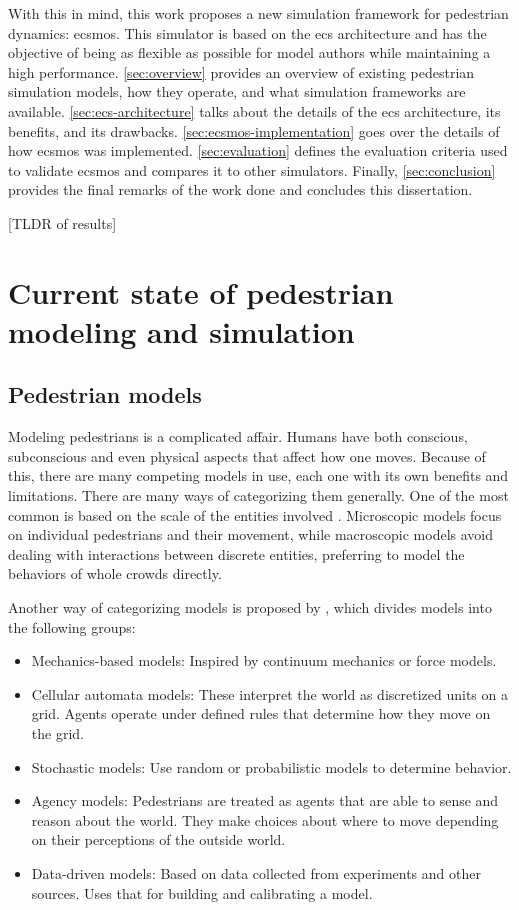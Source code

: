 \documentclass[twoside, 11pt]{article}
\begin{document}
With this in mind, this work proposes a new simulation framework for pedestrian dynamics: \gls{ecsmos}. This simulator is based on the \gls{ecs} architecture and has the objective of being as flexible as possible for model authors while maintaining a high performance. \autoref{sec:overview} provides an overview of existing pedestrian simulation models, how they operate, and what simulation frameworks are available. \autoref{sec:ecs-architecture} talks about the details of the \gls{ecs} architecture, its benefits, and its drawbacks. \autoref{sec:ecsmos-implementation} goes over the details of how \gls{ecsmos} was implemented. \autoref{sec:evaluation} defines the evaluation criteria used to validate \gls{ecsmos} and compares it to other simulators. Finally, \autoref{sec:conclusion} provides the final remarks of the work done and concludes this dissertation.

[TLDR of results]

\section{Current state of pedestrian modeling and simulation} \label{sec:overview}

\subsection{Pedestrian models}

Modeling pedestrians is a complicated affair. Humans have both conscious, subconscious and even physical aspects that affect how one moves. Because of this, there are many competing models in use, each one with its own benefits and limitations. There are many ways of categorizing them generally. One of the most common is based on the scale of the entities involved \cite{kleinmeierVadereOpenSourceSimulation2019}. Microscopic models focus on individual pedestrians and their movement, while macroscopic models avoid dealing with interactions between discrete entities, preferring to model the behaviors of whole crowds directly.

Another way of categorizing models is proposed by \cite{martinez-gilModelingEvaluationScale2017}, which divides models into the following groups:

\begin{itemize}
  \item Mechanics-based models: Inspired by continuum mechanics or force models.
  \item Cellular automata models: These interpret the world as discretized units on a grid. Agents operate under defined rules that determine how they move on the grid.
  \item Stochastic models: Use random or probabilistic models to determine behavior.
  \item Agency models: Pedestrians are treated as agents that are able to sense and reason about the world. They make choices about where to move depending on their perceptions of the outside world.
  \item Data-driven models: Based on data collected from experiments and other sources. Uses that for building and calibrating a model.
\end{itemize}
\end{document}
